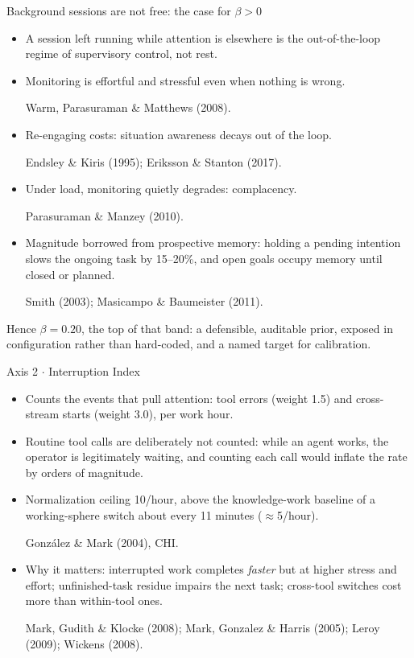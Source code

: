 \documentclass[aspectratio=169,10pt]{beamer}
\newcommand{\good}[1]{\textcolor{Sage}{#1}}
\newcommand{\warnc}[1]{\textcolor{Amber}{#1}}
\newcommand{\src}[1]{{\scriptsize\color{InkFaint}#1\par}}
\begin{document}
\begin{frame}{Background sessions are not free: the case for $\beta > 0$}
  \begin{itemize}
    \item A session left running while attention is elsewhere is the
          \good{out-of-the-loop regime} of supervisory control, not rest.
    \item Monitoring is \warnc{effortful and stressful} even when nothing is
          wrong. \src{Warm, Parasuraman \& Matthews (2008).}
    \item Re-engaging costs: situation awareness decays out of the loop.
          \src{Endsley \& Kiris (1995); Eriksson \& Stanton (2017).}
    \item Under load, monitoring quietly degrades: \warnc{complacency}.
          \src{Parasuraman \& Manzey (2010).}
    \item Magnitude borrowed from prospective memory: holding a pending
          intention slows the ongoing task by \good{15--20\%}, and open
          goals occupy memory until closed or planned.
          \src{Smith (2003); Masicampo \& Baumeister (2011).}
  \end{itemize}
  \vspace{1mm}
  {\small Hence $\beta=0.20$, the top of that band: a \good{defensible,
   auditable prior}, exposed in configuration rather than hard-coded, and a
   named target for calibration.\par}
\end{frame}

\begin{frame}{Axis 2 $\cdot$ Interruption Index}
  \begin{itemize}
    \item Counts the events that \alert{pull attention}: tool
          \warnc{errors} (weight 1.5) and \warnc{cross-stream starts}
          (weight 3.0), per work hour.
    \item Routine tool calls are \good{deliberately not counted}: while an
          agent works, the operator is legitimately waiting, and counting
          each call would inflate the rate by orders of magnitude.
    \item Normalization ceiling 10/hour, above the knowledge-work baseline
          of a working-sphere switch about every 11 minutes
          ($\approx$5/hour).
          \src{Gonz\'alez \& Mark (2004), CHI.}
    \item Why it matters: interrupted work completes \emph{faster} but at
          higher stress and effort; unfinished-task residue impairs the next
          task; cross-tool switches cost more than within-tool ones.
          \src{Mark, Gudith \& Klocke (2008); Mark, Gonzalez \& Harris (2005);
               Leroy (2009); Wickens (2008).}
  \end{itemize}
\end{frame}
\end{document}
